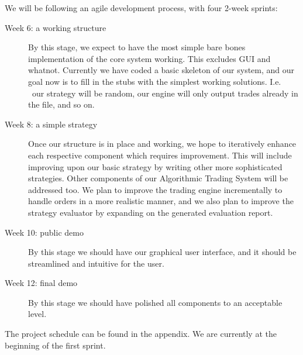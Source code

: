 \documentclass{article}
\begin{document}
We will be following an agile development process, with four 2-week sprints:
\begin{description}
  \item[Week 6: a working structure] By this stage, we expect to have the most simple bare bones implementation of the core system working. This excludes GUI and whatnot. Currently we have coded a basic skeleton of our system, and our goal now is to fill in the stubs with the simplest working solutions. I.e. \ our strategy will be random, our engine will only output trades already in the file, and so on.
  \item[Week 8: a simple strategy] Once our structure is in place and working, we hope to iteratively enhance each respective component which requires improvement. This will include improving upon our basic strategy by writing other more sophisticated strategies. Other components of our Algorithmic Trading System will be addressed too. We plan to improve the trading engine incrementally to handle orders in a more realistic manner, and we also plan to improve the strategy evaluator by expanding on the generated evaluation report.
  \item[Week 10: public demo] By this stage we should have our graphical user interface, and it should be streamlined and intuitive for the user.
  \item[Week 12: final demo] By this stage we should have polished all components to an acceptable level.
\end{description}

The project schedule can be found in the appendix. We are currently at the beginning of the first sprint.
\end{document}
